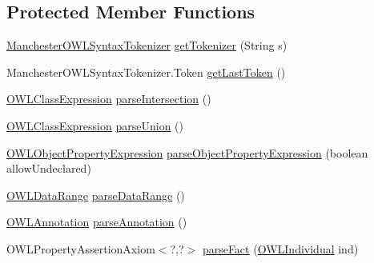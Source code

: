 \subsection*{Protected Member Functions}
\begin{DoxyCompactItemize}
\item 
\hyperlink{classorg_1_1coode_1_1owlapi_1_1manchesterowlsyntax_1_1_manchester_o_w_l_syntax_tokenizer}{Manchester\-O\-W\-L\-Syntax\-Tokenizer} \hyperlink{classorg_1_1coode_1_1owlapi_1_1manchesterowlsyntax_1_1_manchester_o_w_l_syntax_editor_parser_abdc08a7fed0a9cfdebeb3ad83aed0206}{get\-Tokenizer} (String s)
\item 
Manchester\-O\-W\-L\-Syntax\-Tokenizer.\-Token \hyperlink{classorg_1_1coode_1_1owlapi_1_1manchesterowlsyntax_1_1_manchester_o_w_l_syntax_editor_parser_af75f0b3def33954a90afc3cd773a7e0e}{get\-Last\-Token} ()
\item 
\hyperlink{interfaceorg_1_1semanticweb_1_1owlapi_1_1model_1_1_o_w_l_class_expression}{O\-W\-L\-Class\-Expression} \hyperlink{classorg_1_1coode_1_1owlapi_1_1manchesterowlsyntax_1_1_manchester_o_w_l_syntax_editor_parser_ae5a88fdafcb4c2afe341e4f9b831fbe7}{parse\-Intersection} ()
\item 
\hyperlink{interfaceorg_1_1semanticweb_1_1owlapi_1_1model_1_1_o_w_l_class_expression}{O\-W\-L\-Class\-Expression} \hyperlink{classorg_1_1coode_1_1owlapi_1_1manchesterowlsyntax_1_1_manchester_o_w_l_syntax_editor_parser_a28872ea6a86e92cf30f40b4b2ee60520}{parse\-Union} ()
\item 
\hyperlink{interfaceorg_1_1semanticweb_1_1owlapi_1_1model_1_1_o_w_l_object_property_expression}{O\-W\-L\-Object\-Property\-Expression} \hyperlink{classorg_1_1coode_1_1owlapi_1_1manchesterowlsyntax_1_1_manchester_o_w_l_syntax_editor_parser_a74baab2c6de48ec66dfa693c89989879}{parse\-Object\-Property\-Expression} (boolean allow\-Undeclared)
\item 
\hyperlink{interfaceorg_1_1semanticweb_1_1owlapi_1_1model_1_1_o_w_l_data_range}{O\-W\-L\-Data\-Range} \hyperlink{classorg_1_1coode_1_1owlapi_1_1manchesterowlsyntax_1_1_manchester_o_w_l_syntax_editor_parser_a0e416486e4d5d17efbf40e0bf2f7e2ee}{parse\-Data\-Range} ()
\item 
\hyperlink{interfaceorg_1_1semanticweb_1_1owlapi_1_1model_1_1_o_w_l_annotation}{O\-W\-L\-Annotation} \hyperlink{classorg_1_1coode_1_1owlapi_1_1manchesterowlsyntax_1_1_manchester_o_w_l_syntax_editor_parser_a677f6ae6dc2bdb4056e5c3b11f343fd6}{parse\-Annotation} ()
\item 
O\-W\-L\-Property\-Assertion\-Axiom$<$?,?$>$ \hyperlink{classorg_1_1coode_1_1owlapi_1_1manchesterowlsyntax_1_1_manchester_o_w_l_syntax_editor_parser_a751bd89bbded20428deaaf7e6d37a35b}{parse\-Fact} (\hyperlink{interfaceorg_1_1semanticweb_1_1owlapi_1_1model_1_1_o_w_l_individual}{O\-W\-L\-Individual} ind)

\end{DoxyCompactItemize}
